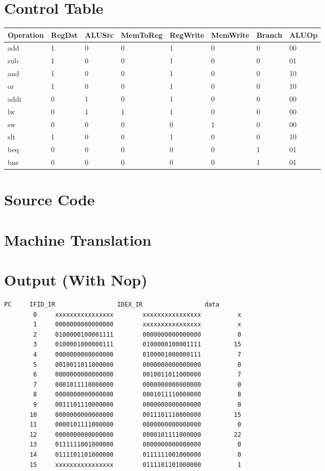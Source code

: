 \documentclass{article}
\newenvironment{problem}[1]{
  \nobreak\section*{#1}
}{}
\begin{document}
  \begin{problem}{Control Table}
    \begin{table}[]
      \begin{tabular}{@{}llllllll@{}}
      Operation & RegDst & ALUSrc & MemToReg & RegWrite & MemWrite & Branch & ALUOp \\ \midrule
      add & 1 & 0 & 0 & 1 & 0 & 0 & 00 \\
      sub & 1 & 0 & 0 & 1 & 0 & 0 & 01 \\
      and & 1 & 0 & 0 & 1 & 0 & 0 & 10 \\
      or & 1 & 0 & 0 & 1 & 0 & 0 & 10 \\
      addi & 0 & 1 & 0 & 1 & 0 & 0 & 00 \\
      lw & 0 & 1 & 1 & 1 & 0 & 0 & 00 \\
      sw & 0 & 0 & 0 & 0 & 1 & 0 & 00 \\
      slt & 1 & 0 & 0 & 1 & 0 & 0 & 10 \\
      beq & 0 & 0 & 0 & 0 & 0 & 1 & 01 \\
      bne & 0 & 0 & 0 & 0 & 0 & 1 & 01
      \end{tabular}
    \end{table}
  \end{problem}

  \begin{problem}{Source Code}
    
  \end{problem}

  \begin{problem}{Machine Translation}
    
  \end{problem}

  \begin{problem}{Output (With Nop)}
    \begin{center}
      \begin{lstlisting}[basicstyle=\footnotesize\ttfamily]
        PC     IFID_IR                 IDEX_IR                 data
        0     xxxxxxxxxxxxxxxx        xxxxxxxxxxxxxxxx          x
        1     0000000000000000        xxxxxxxxxxxxxxxx          x
        2     0100000100001111        0000000000000000          0
        3     0100001000000111        0100000100001111         15
        4     0000000000000000        0100001000000111          7
        5     0010011011000000        0000000000000000          0
        6     0000000000000000        0010011011000000          7
        7     0001011110000000        0000000000000000          0
        8     0000000000000000        0001011110000000          8
        9     0011101110000000        0000000000000000          0
       10     0000000000000000        0011101110000000         15
       11     0000101111000000        0000000000000000          0
       12     0000000000000000        0000101111000000         22
       13     0111111001000000        0000000000000000          0
       14     0111101101000000        0111111001000000          0
       15     xxxxxxxxxxxxxxxx        0111101101000000          1
      \end{lstlisting}
    \end{center}
  \end{problem}
\end{document}

